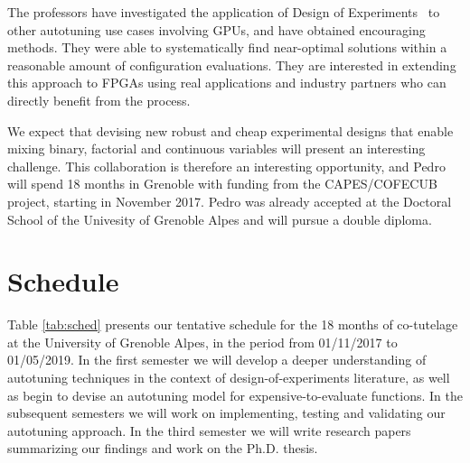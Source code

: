 The professors have investigated the application of Design of
Experiments~\cite{fisher1937design} to other autotuning use cases involving
GPUs, and have obtained encouraging methods. They were able to systematically
find near-optimal solutions within a reasonable amount of configuration
evaluations. They are interested in extending this approach to FPGAs using real
applications and industry partners who can directly benefit from the process.

We expect that devising new robust and cheap experimental designs that enable
mixing binary, factorial and continuous variables will present an interesting
challenge.  This collaboration is therefore an interesting opportunity, and
Pedro will spend 18 months in Grenoble with funding from the CAPES/COFECUB
project, starting in November 2017. Pedro was already accepted at the Doctoral
School of the Univesity of Grenoble Alpes and will pursue a double diploma.

\section{Schedule}
\label{sec:schedule}

Table \ref{tab:sched} presents our tentative schedule for the 18 months of
co-tutelage at the University of Grenoble Alpes, in the period from 01/11/2017
to 01/05/2019. In the first semester we will develop a deeper understanding of
autotuning techniques in the context of design-of-experiments literature, as
well as begin to devise an autotuning model for expensive-to-evaluate
functions. In the subsequent semesters we will work on implementing, testing
and validating our autotuning approach. In the third semester we will write
research papers summarizing our findings and work on the Ph.D. thesis.

